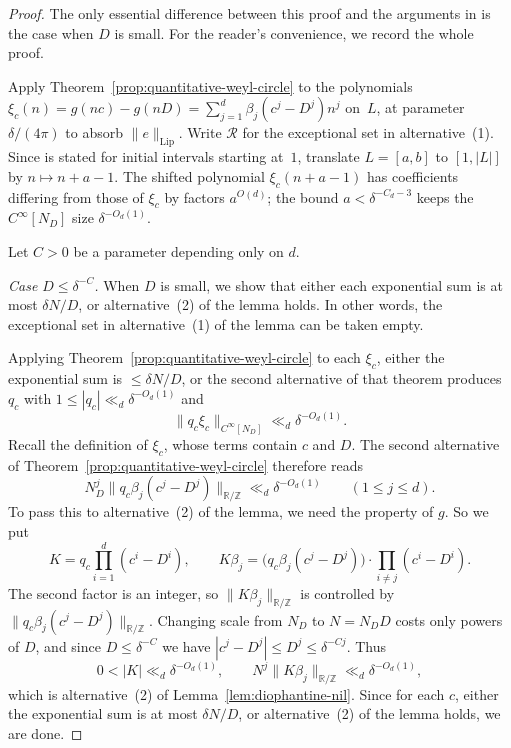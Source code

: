 \begin{proof}
The only essential difference between this proof and the arguments in \cite[\S3]{GTmob} is the case when $D$ is small.
For the reader's convenience, we record the whole proof.

Apply Theorem~\ref{prop:quantitative-weyl-circle} to the polynomials
\(\xi_c(n)=g(nc)-g(nD)=\sum_{j=1}^d\beta_j(c^j-D^j)n^j\) on~$L$, at
parameter \(\delta/(4\pi)\) to absorb \(\|e\|_{\mathrm{Lip}}\).
Write \(\mathcal R\) for the exceptional set in
alternative~(1).  Since \cite{BT} is stated for initial intervals starting at~$1$, translate
\(L=[a,b]\) to \([1,|L|]\) by \(n\mapsto n+a-1\).
The shifted polynomial \(\xi_c(n+a-1)\) has coefficients differing from
those of \(\xi_c\) by factors \(a^{O(d)}\); the bound \(a<\delta^{-C_d-3}\)
keeps the \(C^\infty[N_D]\) size \(\delta^{-O_d(1)}\).

Let $C>0$ be a parameter depending only on $d$.

\smallskip\noindent\textit{Case \(D\le\delta^{-C}\).}
When $D$ is small, we show that either each exponential sum is
at most \(\delta N/D\), or alternative~(2) of the lemma holds.
In other words, the exceptional set in alternative~(1) of the lemma
can be taken empty.

Applying Theorem~\ref{prop:quantitative-weyl-circle} to each \(\xi_c\),
either the exponential sum is \(\le\delta N/D\), or the second
alternative of that theorem produces \(q_c\) with
\(1\le|q_c|\ll_d\delta^{-O_d(1)}\) and
\[
\|q_c\xi_c\|_{C^\infty[N_D]}\ll_d\delta^{-O_d(1)}.
\]
Recall the definition of \(\xi_c\), whose terms contain \(c\) and \(D\).
The second alternative of Theorem~\ref{prop:quantitative-weyl-circle}
therefore reads
\[
N_D^j\bigl\|q_c\beta_j(c^j-D^j)\bigr\|_{\mathbb R/\mathbb Z}
\ll_d\delta^{-O_d(1)}
\qquad(1\le j\le d).
\]
To pass this to alternative~(2) of the lemma, we need the property of $g$.
So we put
\[
K=q_c\prod_{i=1}^d(c^i-D^i),
\qquad
K\beta_j
=\bigl(q_c\beta_j(c^j-D^j)\bigr)
\cdot\prod_{i\neq j}(c^i-D^i).
\]
The second factor is an integer, so \(\|K\beta_j\|_{\mathbb R/\mathbb Z}\) is controlled by
\(\|q_c\beta_j(c^j-D^j)\|_{\mathbb R/\mathbb Z}\).  Changing scale from \(N_D\) to \(N=N_DD\)
costs only powers of \(D\), and since \(D\le\delta^{-C}\) we have
\(|c^j-D^j|\le D^j\le\delta^{-Cj}\).  Thus
\[
0<|K|\ll_d\delta^{-O_d(1)},
\qquad
N^j\|K\beta_j\|_{\mathbb R/\mathbb Z}\ll_d\delta^{-O_d(1)},
\]
which is alternative~(2) of Lemma~\ref{lem:diophantine-nil}.
Since for each $c$, either the exponential sum is at most $\delta N/D$, or alternative~(2) of the lemma holds, we are done.



\end{proof}
